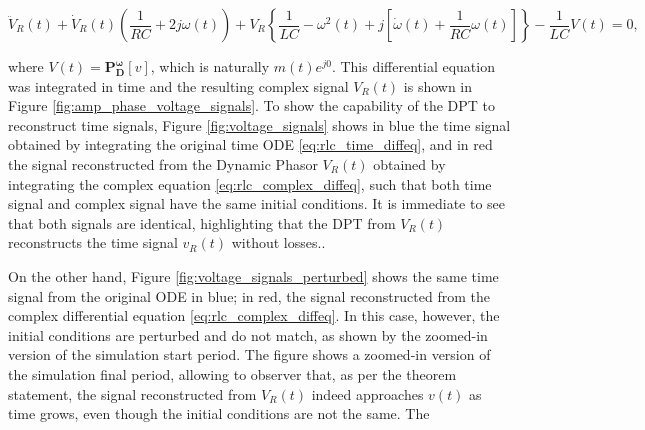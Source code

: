 \begin{example}
\begin{equation} \ddot{V}_R(t) + \dot{V}_R(t)\left(\dfrac{1}{RC} + 2j\omega(t)\right) + V_R\left\{ \dfrac{1}{LC}  -\omega^2(t) + j \left[ \dot{\omega}(t) + \dfrac{1}{RC}\omega(t)\right]\right\} -\dfrac{1}{LC} V(t) = 0, \label{eq:rlc_complex_diffeq}\end{equation}

	\noindent where $V(t) = \mathbf{P_D^{\omega}}\left[v\right]$, which is naturally $m(t)e^{j0}$. This differential equation was integrated in time and the resulting complex signal $V_R(t)$ is shown in Figure \ref{fig:amp_phase_voltage_signals}. To show the capability of the DPT to reconstruct time signals, Figure \ref{fig:voltage_signals} shows in blue the time signal obtained by integrating the original time ODE \eqref{eq:rlc_time_diffeq}, and in red the signal reconstructed from the Dynamic Phasor $V_R(t)$ obtained by integrating the complex equation \eqref{eq:rlc_complex_diffeq}, such that both time signal and complex signal have the same initial conditions. It is immediate to see that both signals are identical, highlighting that the DPT from $V_R(t)$ reconstructs the time signal $v_R(t)$ without losses..

	On the other hand, Figure \ref{fig:voltage_signals_perturbed} shows the same time signal from the original ODE in blue; in red, the signal reconstructed from the complex differential equation \eqref{eq:rlc_complex_diffeq}. In this case, however, the initial conditions are perturbed and do not match, as shown by the zoomed-in version of the simulation start period. The figure shows a zoomed-in version of the simulation final period, allowing to observer that, as per the theorem statement, the signal reconstructed from $V_R(t)$ indeed approaches $v(t)$ as time grows, even though the initial conditions are not the same. The


\end{example}
